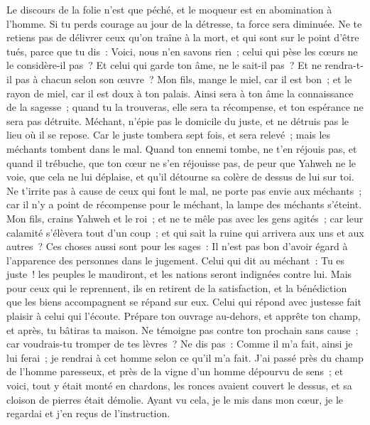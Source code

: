 \begin{multicols}{2}
Le discours de la folie n'est que péché, et le moqueur est en abomination à l'homme.
Si tu perds courage au jour de la détresse, ta force sera diminuée.
Ne te retiens pas de délivrer ceux qu'on traîne à la mort, et qui sont sur le point d'être tués,
parce que tu dis~: Voici, nous n'en savons rien~; celui qui pèse les cœurs ne le considère-il pas~? Et celui qui garde ton âme, ne le sait-il pas~? Et ne rendra-t-il pas à chacun selon son œuvre~?
Mon fils, mange le miel, car il est bon~; et le rayon de miel, car il est doux à ton palais.
Ainsi sera à ton âme la connaissance de la sagesse~; quand tu la trouveras, elle sera ta récompense, et ton espérance ne sera pas détruite.
Méchant, n'épie pas le domicile du juste, et ne détruis pas le lieu où il se repose.
Car le juste tombera sept fois, et sera relevé~; mais les méchants tombent dans le mal.
Quand ton ennemi tombe, ne t'en réjouis pas, et quand il trébuche, que ton cœur ne s'en réjouisse pas,
de peur que Yahweh ne le voie, que cela ne lui déplaise, et qu'il détourne sa colère de dessus de lui sur toi.
Ne t'irrite pas à cause de ceux qui font le mal, ne porte pas envie aux méchants~;
car il n'y a point de récompense pour le méchant, la lampe des méchants s'éteint.
Mon fils, crains Yahweh et le roi~; et ne te mêle pas avec les gens agités~;
car leur calamité s'élèvera tout d'un coup~; et qui sait la ruine qui arrivera aux uns et aux autres~?
Ces choses aussi sont pour les sages~: Il n'est pas bon d'avoir égard à l'apparence des personnes dans le jugement.
Celui qui dit au méchant~: Tu es juste~! les peuples le maudiront, et les nations seront indignées contre lui.
Mais pour ceux qui le reprennent, ils en retirent de la satisfaction, et la bénédiction que les biens accompagnent se répand sur eux.
Celui qui répond avec justesse fait plaisir à celui qui l'écoute.
Prépare ton ouvrage au-dehors, et apprête ton champ, et après, tu bâtiras ta maison.
Ne témoigne pas contre ton prochain sans cause~; car voudrais-tu tromper de tes lèvres~?
Ne dis pas~: Comme il m'a fait, ainsi je lui ferai~; je rendrai à cet homme selon ce qu'il m'a fait.
J'ai passé près du champ de l'homme paresseux, et près de la vigne d'un homme dépourvu de sens~;
et voici, tout y était monté en chardons, les ronces avaient couvert le dessus, et sa cloison de pierres était démolie.
Ayant vu cela, je le mis dans mon cœur, je le regardai et j'en reçus de l'instruction.

\end{multicols}
